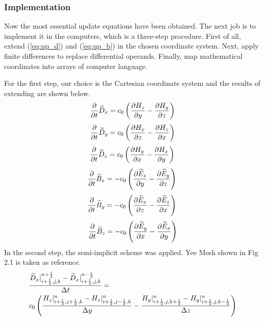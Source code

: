 \subsubsection{Implementation}
Now the most essential update equations have been obtained. The next job is to implement it in the computers, which is a
three-step procedure. First of all, extend (\ref{eq:up_d}) and (\ref{eq:up_b}) in the chosen coordinate system. Next, apply
finite differences to replace differential operands. Finally, map mathematical coordinates into arrays of computer
language.

For the first step, our choice is the Cartesian coordinate system and the results of extending are shown below.
\begin{equation}
  \frac{\partial}{\partial t} \widetilde{D}_x = c_0 \left( \frac{\partial H_z}{\partial y} - \frac{\partial H_y}{\partial z} \right) \label{eq:up_d_x}
\end{equation}
\begin{equation}
  \frac{\partial}{\partial t} \widetilde{D}_y = c_0 \left( \frac{\partial H_x}{\partial z} - \frac{\partial H_z}{\partial x} \right) \label{eq:up_d_y}  
\end{equation}
\begin{equation}
  \frac{\partial}{\partial t} \widetilde{D}_z = c_0 \left( \frac{\partial H_y}{\partial x} - \frac{\partial H_x}{\partial y} \right) \label{eq:up_d_z}\\  
\end{equation}
\begin{equation}
  \frac{\partial}{\partial t} \widetilde{B}_x =-c_0 \left(\frac{\partial \widetilde{E}_z}{\partial y} - \frac{\partial \widetilde{E}_y}{\partial z}\right) \label{eq:up_b_x}\\  
\end{equation}
\begin{equation}
  \frac{\partial}{\partial t} \widetilde{B}_y =-c_0 \left(\frac{\partial \widetilde{E}_x}{\partial z} - \frac{\partial \widetilde{E}_z}{\partial x}\right) \label{eq:up_b_y}\\  
\end{equation}
\begin{equation}
  \frac{\partial}{\partial t} \widetilde{B}_z =-c_0 \left(\frac{\partial \widetilde{E}_y}{\partial x} - \frac{\partial \widetilde{E}_x}{\partial y}\right) \label{eq:up_b_z}
\end{equation}
In the second step, the semi-implicit scheme was applied. Yee Mesh shown in Fig 2.1 is taken as reference.
\begin{equation}
  \begin{split}
    \displaystyle & \frac{\widetilde{D}_x|_{i+\frac{1}{2},j,k}^{n+\frac{1}{2}} - \widetilde{D}_x|_{i+\frac{1}{2},j,k}^{n-\frac{1}{2}}}{\Delta t} = \\
    \displaystyle & c_0\left(\frac{H_z|_{i+\frac{1}{2},j+\frac{1}{2},k}^{n} - H_z|_{i+\frac{1}{2},j-\frac{1}{2},k}^{n}}{\Delta y} - \frac{H_y|_{i+\frac{1}{2},j,k+\frac{1}{2}}^{n} - H_y|_{i+\frac{1}{2},j,k-\frac{1}{2}}^{n}}{\Delta z}\right)\\
  \end{split}
\end{equation}
